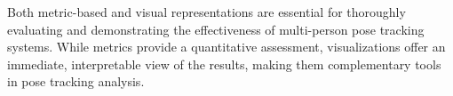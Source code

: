 Both metric-based and visual representations are essential for thoroughly
evaluating and demonstrating the effectiveness of multi-person pose tracking
systems. While metrics provide a quantitative assessment, visualizations offer
an immediate, interpretable view of the results, making them complementary tools
in pose tracking analysis.
